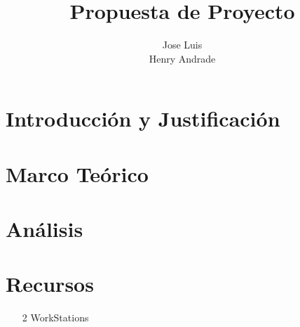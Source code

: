 \documentclass[10pt,a4paper]{article}
\title{Propuesta de Proyecto}
\author{Jose Luis\\Henry Andrade}
\begin{document}
\maketitle
\section{Introducción y Justificación}
\section{Marco Teórico}
\section{Análisis}
\section{Recursos}
\begin{itemize}
		\item[2 WorkStations]
\end{itemize}
\end{document}
